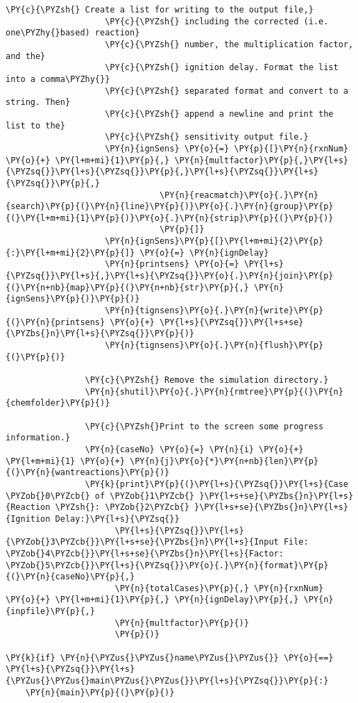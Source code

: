 \begin{Verbatim}[commandchars=\\\{\}]
                    \PY{c}{\PYZsh{} Create a list for writing to the output file,}
                    \PY{c}{\PYZsh{} including the corrected (i.e. one\PYZhy{}based) reaction}
                    \PY{c}{\PYZsh{} number, the multiplication factor, and the}
                    \PY{c}{\PYZsh{} ignition delay. Format the list into a comma\PYZhy{}}
                    \PY{c}{\PYZsh{} separated format and convert to a string. Then}
                    \PY{c}{\PYZsh{} append a newline and print the list to the}
                    \PY{c}{\PYZsh{} sensitivity output file.}
                    \PY{n}{ignSens} \PY{o}{=} \PY{p}{[}\PY{n}{rxnNum} \PY{o}{+} \PY{l+m+mi}{1}\PY{p}{,} \PY{n}{multfactor}\PY{p}{,}\PY{l+s}{\PYZsq{}}\PY{l+s}{\PYZsq{}}\PY{p}{,}\PY{l+s}{\PYZsq{}}\PY{l+s}{\PYZsq{}}\PY{p}{,}
                               \PY{n}{reacmatch}\PY{o}{.}\PY{n}{search}\PY{p}{(}\PY{n}{line}\PY{p}{)}\PY{o}{.}\PY{n}{group}\PY{p}{(}\PY{l+m+mi}{1}\PY{p}{)}\PY{o}{.}\PY{n}{strip}\PY{p}{(}\PY{p}{)}
                               \PY{p}{]}
                    \PY{n}{ignSens}\PY{p}{[}\PY{l+m+mi}{2}\PY{p}{:}\PY{l+m+mi}{2}\PY{p}{]} \PY{o}{=} \PY{n}{ignDelay}
                    \PY{n}{printsens} \PY{o}{=} \PY{l+s}{\PYZsq{}}\PY{l+s}{,}\PY{l+s}{\PYZsq{}}\PY{o}{.}\PY{n}{join}\PY{p}{(}\PY{n+nb}{map}\PY{p}{(}\PY{n+nb}{str}\PY{p}{,} \PY{n}{ignSens}\PY{p}{)}\PY{p}{)}
                    \PY{n}{tignsens}\PY{o}{.}\PY{n}{write}\PY{p}{(}\PY{n}{printsens} \PY{o}{+} \PY{l+s}{\PYZsq{}}\PY{l+s+se}{\PYZbs{}n}\PY{l+s}{\PYZsq{}}\PY{p}{)}
                    \PY{n}{tignsens}\PY{o}{.}\PY{n}{flush}\PY{p}{(}\PY{p}{)}

                \PY{c}{\PYZsh{} Remove the simulation directory.}
                \PY{n}{shutil}\PY{o}{.}\PY{n}{rmtree}\PY{p}{(}\PY{n}{chemfolder}\PY{p}{)}

                \PY{c}{\PYZsh{}Print to the screen some progress information.}
                \PY{n}{caseNo} \PY{o}{=} \PY{n}{i} \PY{o}{+} \PY{l+m+mi}{1} \PY{o}{+} \PY{n}{j}\PY{o}{*}\PY{n+nb}{len}\PY{p}{(}\PY{n}{wantreactions}\PY{p}{)}
                \PY{k}{print}\PY{p}{(}\PY{l+s}{\PYZsq{}}\PY{l+s}{Case \PYZob{}0\PYZcb{} of \PYZob{}1\PYZcb{} }\PY{l+s+se}{\PYZbs{}n}\PY{l+s}{Reaction \PYZsh{}: \PYZob{}2\PYZcb{} }\PY{l+s+se}{\PYZbs{}n}\PY{l+s}{Ignition Delay:}\PY{l+s}{\PYZsq{}}
                      \PY{l+s}{\PYZsq{}}\PY{l+s}{\PYZob{}3\PYZcb{}}\PY{l+s+se}{\PYZbs{}n}\PY{l+s}{Input File: \PYZob{}4\PYZcb{}}\PY{l+s+se}{\PYZbs{}n}\PY{l+s}{Factor: \PYZob{}5\PYZcb{}}\PY{l+s}{\PYZsq{}}\PY{o}{.}\PY{n}{format}\PY{p}{(}\PY{n}{caseNo}\PY{p}{,}
                      \PY{n}{totalCases}\PY{p}{,} \PY{n}{rxnNum} \PY{o}{+} \PY{l+m+mi}{1}\PY{p}{,} \PY{n}{ignDelay}\PY{p}{,} \PY{n}{inpfile}\PY{p}{,}
                      \PY{n}{multfactor}\PY{p}{)}
                      \PY{p}{)}

\PY{k}{if} \PY{n}{\PYZus{}\PYZus{}name\PYZus{}\PYZus{}} \PY{o}{==} \PY{l+s}{\PYZsq{}}\PY{l+s}{\PYZus{}\PYZus{}main\PYZus{}\PYZus{}}\PY{l+s}{\PYZsq{}}\PY{p}{:}
    \PY{n}{main}\PY{p}{(}\PY{p}{)}
\end{Verbatim}
